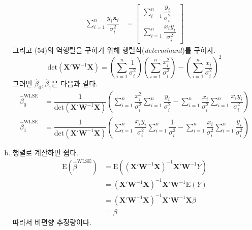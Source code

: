 \documentclass[answers]{exam}
\begin{document}
\begin{questions}
\begin{solution}
\begin{enumerate}[(a)]
\begin{align}
          \sum_{i=1}^{n}\dfrac{y_{i}\mathbf{x}_{i}}{\sigma_{i}^{2}} &= \begin{bmatrix}\displaystyle \sum_{i=1}^{n}\dfrac{y_{i}}{\sigma_{i}^{2}}\\ \displaystyle \sum_{i=1}^{n}\dfrac{x_{i}y_{i}}{\sigma_{i}^{2}} \end{bmatrix}
        \end{align}
        그리고 (54)의 역행렬을 구하기 위해 행렬식(\emph{determinant})를 구하자.
        \begin{equation}
          \mathrm{det}\left(\mathbf{X}'\mathbf{W}^{-1}\mathbf{X}\right) = \left(\sum_{i=1}^{n}\dfrac{1}{\sigma_{i}^{2}}\right)\left(\sum_{i=1}^{n}\dfrac{x_{i}^{2}}{\sigma_{i}^{2}}\right)-\left(\sum_{i=1}^{n}\dfrac{x_{i}}{\sigma_{i}^{2}}\right)^{2}
        \end{equation}
        그러면 $\widehat{\beta}_{0},\widehat{\beta}_{1}$은 다음과 같다.
        \begin{align}
          \widehat{\beta}_{0}^{\text{WLSE}} &= \dfrac{1}{\mathrm{det}\left(\mathbf{X}'\mathbf{W}^{-1}\mathbf{X}\right)}\left(\sum_{i=1}^{n}\dfrac{x_{i}^{2}}{\sigma_{i}^{2}}\sum_{i=1}^{n}\dfrac{y_{i}}{\sigma_{i}^{2}}-\sum_{i=1}^{n}\dfrac{x_{i}}{\sigma_{i}^{2}}\sum_{i=1}^{n}\dfrac{x_{i}y_{i}}{\sigma_{i}^{2}}\right)\\
          \widehat{\beta}_{1}^{\text{WLSE}} &= \dfrac{1}{\mathrm{det}\left(\mathbf{X}'\mathbf{W}^{-1}\mathbf{X}\right)}\left(\sum_{i=1}^{n}\dfrac{x_{i}y_{i}}{\sigma_{i}^{2}}\sum_{i=1}^{n}\dfrac{1}{\sigma_{i}^{2}}-\sum_{i=1}^{n}\dfrac{x_{i}}{\sigma_{i}^{2}}\sum_{i=1}^{n}\dfrac{y_{i}}{\sigma_{i}^{2}}\right)
        \end{align}
        \item 행렬로 계산하면 쉽다.
        \begin{align}
          \mathrm{E}\left(\widehat{\beta}^{\text{WLSE}}\right) &= \mathrm{E}\left(\left(\mathbf{X}'\mathbf{W}^{-1}\mathbf{X}\right)^{-1}\mathbf{X}'\mathbf{W}^{-1}Y\right)\\
          &= \left(\mathbf{X}'\mathbf{W}^{-1}\mathbf{X}\right)^{-1}\mathbf{X}'\mathbf{W}^{-1}\mathrm{E}\left(Y\right)\\
          &= \left(\mathbf{X}'\mathbf{W}^{-1}\mathbf{X}\right)^{-1}\mathbf{X}'\mathbf{W}^{-1}\mathbf{X}\beta\\
          &= \beta
        \end{align}
        따라서 비편향 추정량이다.
      \end{enumerate}
    \end{solution}
\end{questions}
\end{document}
